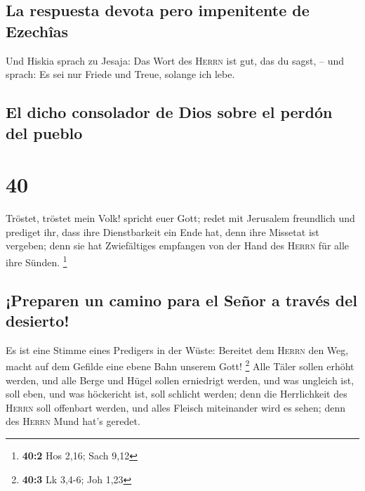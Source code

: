 \hypertarget{la-respuesta-devota-pero-impenitente-de-ezechuxeeas}{%
\subsection{La respuesta devota pero impenitente de
Ezechîas}\label{la-respuesta-devota-pero-impenitente-de-ezechuxeeas}}

 Und Hiskia sprach zu Jesaja: Das Wort des \textsc{Herrn}
ist gut, das du sagst, -- und sprach: Es sei nur Friede und Treue,
solange ich lebe.

\hypertarget{el-dicho-consolador-de-dios-sobre-el-perduxf3n-del-pueblo}{%
\subsection{El dicho consolador de Dios sobre el perdón del
pueblo}\label{el-dicho-consolador-de-dios-sobre-el-perduxf3n-del-pueblo}}

\hypertarget{section-39}{%
\section{40}\label{section-39}}

 Tröstet, tröstet mein Volk! spricht euer Gott;
 redet mit Jerusalem freundlich und prediget ihr, dass
ihre Dienstbarkeit ein Ende hat, denn ihre Missetat ist vergeben; denn
sie hat Zwiefältiges empfangen von der Hand des \textsc{Herrn} für alle
ihre Sünden. \footnote{\textbf{40:2} Hos 2,16; Sach 9,12}

\hypertarget{preparen-un-camino-para-el-seuxf1or-a-travuxe9s-del-desierto}{%
\subsection{¡Preparen un camino para el Señor a través del
desierto!}\label{preparen-un-camino-para-el-seuxf1or-a-travuxe9s-del-desierto}}

 Es ist eine Stimme eines Predigers in der Wüste: Bereitet
dem \textsc{Herrn} den Weg, macht auf dem Gefilde eine ebene Bahn
unserem Gott! \footnote{\textbf{40:3} Lk 3,4-6; Joh 1,23} 
Alle Täler sollen erhöht werden, und alle Berge und Hügel sollen
erniedrigt werden, und was ungleich ist, soll eben, und was höckericht
ist, soll schlicht werden;  denn die Herrlichkeit des
\textsc{Herrn} soll offenbart werden, und alles Fleisch miteinander wird
es sehen; denn des \textsc{Herrn} Mund hat's geredet.

